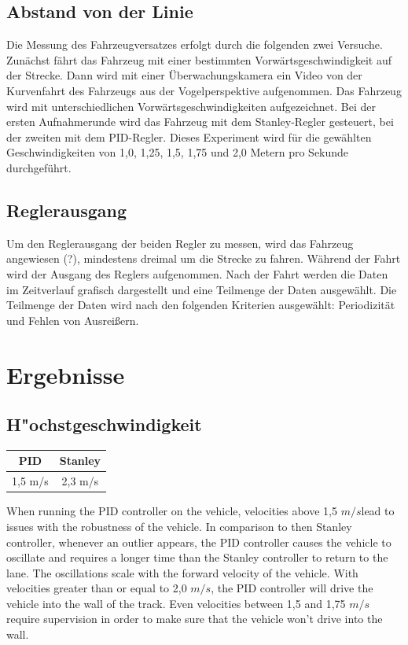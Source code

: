 \documentclass[arbeit=studie,oneside,BCOR=12mm]{ArbeitRST}
\begin{document}
\subsection{Abstand von der Linie}

Die Messung des Fahrzeugversatzes erfolgt durch die folgenden zwei Versuche.
Zunächst fährt das Fahrzeug mit einer bestimmten Vorwärtsgeschwindigkeit auf
der Strecke. Dann wird mit einer Überwachungskamera ein Video von der
Kurvenfahrt des Fahrzeugs aus der Vogelperspektive aufgenommen. Das Fahrzeug
wird mit unterschiedlichen Vorwärtsgeschwindigkeiten aufgezeichnet. Bei der
ersten Aufnahmerunde wird das Fahrzeug mit dem Stanley-Regler gesteuert, bei
der zweiten mit dem PID-Regler. Dieses Experiment wird für die gewählten
Geschwindigkeiten von 1,0, 1,25, 1,5, 1,75 und 2,0 Metern pro Sekunde
durchgeführt.

\subsection{Reglerausgang}

Um den Reglerausgang der beiden Regler zu messen, wird das Fahrzeug angewiesen
(?), mindestens dreimal um die Strecke zu fahren. Während der Fahrt wird der
Ausgang des Reglers aufgenommen. Nach der Fahrt werden die Daten im Zeitverlauf
grafisch dargestellt und eine Teilmenge der Daten ausgewählt. Die Teilmenge der
Daten wird nach den folgenden Kriterien ausgewählt: Periodizität und Fehlen von
Ausreißern.

\section{Ergebnisse}


\subsection{H"ochstgeschwindigkeit}
\begin{center}
\begin{tabular}{|c|c|}
\hline
    PID & Stanley \\
\hline
\hline
    1,5 m/s & 2,3 m/s \\
\hline
\end{tabular}
\end{center}
When running the PID controller on the vehicle, velocities above 1,5
$m/s$lead to issues with the robustness of the vehicle. In comparison
to then Stanley controller, whenever an outlier appears, the PID controller
causes the vehicle to oscillate and requires a longer time than the Stanley
controller to return to the lane. The oscillations scale with the forward
velocity of the vehicle. With velocities greater than or equal to 2,0
$m/s$, the PID controller will drive the vehicle into the wall of the
track. Even velocities between 1,5 and 1,75 $m/s$ require supervision
in order to make sure that the vehicle won't drive into the wall.
\end{document}
